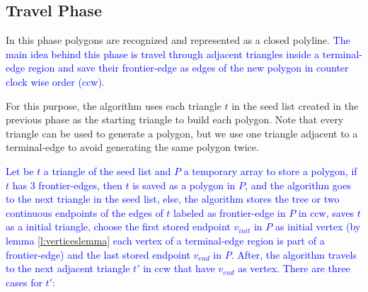 
\subsection{Travel Phase}
\label{subsec:Travelpohase}

In this phase polygons are recognized and represented as a closed polyline.  \textcolor{blue}{The main idea behind this phase is travel through adjacent triangles inside a terminal-edge region and save their frontier-edge as edges of the new polygon in counter clock wise order (ccw).}%

For this purpose, the algorithm  uses each triangle $t$ in the seed list created in the previous phase as the starting triangle to build each polygon. Note that every triangle can be used to generate a polygon, but we use one triangle adjacent to a terminal-edge to avoid generating the same polygon twice. 

\textcolor{blue}{Let be $t$ a triangle of the seed list and $P$ a temporary array to store a polygon, if $t$ has 3 frontier-edges, then $t$ is saved as a polygon in $P$, and the algorithm goes to the next triangle in the seed list, else, the algorithm stores the tree or two continuous endpoints of the edges of $t$ labeled as frontier-edge in $P$ in ccw, saves $t$ as a initial triangle, choose the first stored endpoint $v_{init}$ in $P$ as initial vertex (by lemma \ref{l:verticeslemma} each vertex of a terminal-edge region is part of a frontier-edge) and the last stored endpoint $v_{end}$ in $P$. After, the algorithm travels to the next adjacent triangle $t'$ in ccw that have $v_{end}$ as vertex. There are three cases for $t'$:}








